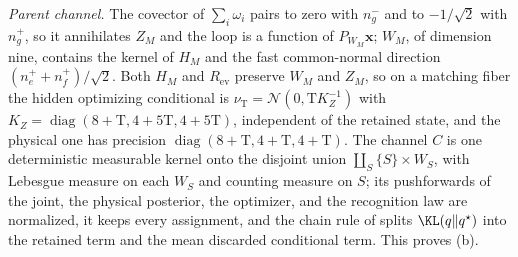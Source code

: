 \emph{Parent channel.} The covector of \(\sum_i\omega_i\) pairs to zero with
\(n^-_g\) and to \(-1/\sqrt2\) with \(n^+_g\), so it annihilates \(Z_M\) and the
loop is a function of \(P_{W_M}\mathbf x\); \(W_M\), of dimension nine, contains
the kernel of \(H_M\) and the fast common-normal direction
\((n^+_e+n^+_f)/\sqrt2\). Both \(H_M\) and \(R_{\mathrm{ev}}\) preserve \(W_M\)
and \(Z_M\), so on a matching fiber the hidden optimizing conditional is
\(\nu_{\mathrm T}=\mathcal N(0,\mathrm TK_Z^{-1})\) with
\(K_Z=\operatorname{diag}(8+\mathrm T,4+5\mathrm T,4+5\mathrm T)\), independent of
the retained state, and the physical one has precision
\(\operatorname{diag}(8+\mathrm T,4+\mathrm T,4+\mathrm T)\). The channel \(C\)
is one deterministic measurable kernel onto the disjoint union
\(\coprod_S\{S\}\times W_S\), with Lebesgue measure on each \(W_S\) and counting
measure on \(S\); its pushforwards of the joint, the physical posterior, the
optimizer, and the recognition law are normalized, it keeps every assignment,
and the chain rule of  splits
\(\KL(q\Vert q^\star)\) into the retained term and the mean discarded
conditional term. This proves (b).

